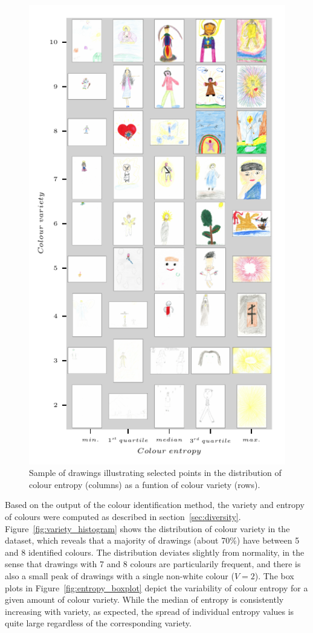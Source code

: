 \documentclass[11pt,a4paper]{article}
\begin{document}
\begin{figure}
	\centering
	\includegraphics[width=0.75\linewidth]{figures/colors-grille.pdf}
	\caption{Sample of drawings illustrating selected points in the distribution of colour entropy (columns) as a funtion of colour variety (rows).}
	\label{fig:grille}
\end{figure}

Based on the output of the colour identification method, the variety and entropy of colours were computed as described in section~\ref{sec:diversity}. Figure~\ref{fig:variety_histogram} shows the distribution of colour variety in the dataset, which reveals that a majority of drawings (about 70\%) have between 5 and 8 identified colours. The distribution deviates slightly from normality, in the sense that drawings with 7 and 8 colours are particularily frequent, and there is also a small peak of drawings with a single non-white colour ($V=2$). The box plots in Figure~\ref{fig:entropy_boxplot} depict the variability of colour entropy for a given amount of  colour variety. While the median of entropy is consistently increasing with variety, as expected, the spread of individual entropy values is quite large regardless of the corresponding variety.
\end{document}
